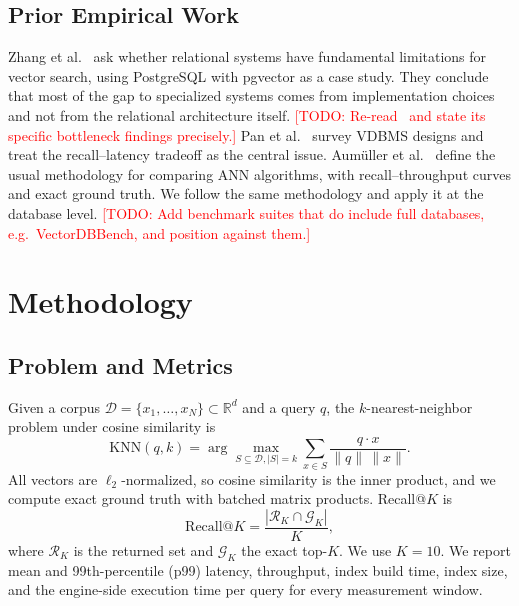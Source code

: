 \documentclass[sigconf, nonacm]{acmart}
\newcommand{\todo}[1]{\textcolor{red}{[TODO: #1]}}
\newcommand{\todo}[1]{\errmessage{Unresolved TODO: #1}}
\begin{document}
\subsection{Prior Empirical Work}

Zhang et al.~\cite{zhang2024} ask whether relational systems have fundamental
limitations for vector search, using PostgreSQL with pgvector as a case study. They
conclude that most of the gap to specialized systems comes from implementation choices
and not from the relational architecture itself. \todo{Re-read~\cite{zhang2024} and state
its specific bottleneck findings precisely.} Pan et al.~\cite{pan2024survey} survey VDBMS
designs and treat the recall--latency tradeoff as the central issue. Aumüller et
al.~\cite{aumuller2020} define the usual methodology for comparing ANN algorithms, with
recall--throughput curves and exact ground truth. We follow the same methodology and
apply it at the database level. \todo{Add benchmark suites that do include full
databases, e.g.\ VectorDBBench, and position against them.}

\section{Methodology}

\subsection{Problem and Metrics}

Given a corpus $\mathcal{D}=\{x_1,\dots,x_N\}\subset\mathbb{R}^d$ and a query $q$, the
$k$-nearest-neighbor problem under cosine similarity is
\begin{equation}
\text{KNN}(q,k)=\arg\max_{S\subseteq\mathcal{D},|S|=k}\sum_{x\in S}
\frac{q\cdot x}{\|q\|\,\|x\|}.
\end{equation}
All vectors are $\ell_2$-normalized, so cosine similarity is the inner product, and we
compute exact ground truth with batched matrix products. Recall@$K$ is
\begin{equation}
\text{Recall@}K=\frac{|\mathcal{R}_K\cap\mathcal{G}_K|}{K},
\end{equation}
where $\mathcal{R}_K$ is the returned set and $\mathcal{G}_K$ the exact top-$K$. We use
$K=10$. We report mean and 99th-percentile (p99) latency, throughput, index build time,
index size, and the engine-side execution time per query for every measurement window.
\end{document}
